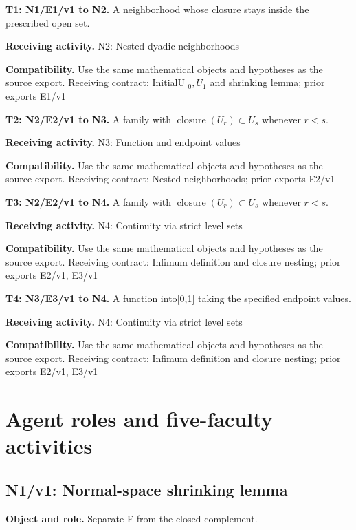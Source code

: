 \documentclass[preprint,12pt,aps,pra,showkeys,amsmath,amssymb,superscriptaddress,floatfix]{revtex4-2}
\theoremstyle{definition}
\theoremstyle{remark}
\newcommand{\field}[2]{\par\smallskip\noindent\textbf{#1.} #2\par}
\begin{document}
\field{T1: N1/E1/v1 to N2}{A neighborhood whose closure stays inside the prescribed open set.}

\field{Receiving activity}{N2: Nested dyadic neighborhoods}

\field{Compatibility}{Use the same mathematical objects and hypotheses as the source export.
Receiving contract: InitialU \(_{0},U_{1}\) and shrinking lemma; prior
exports E1/v1}

\field{T2: N2/E2/v1 to N3}{A family with \(\operatorname{closure} (U_r)\subset U_s\) whenever
\(r<s\).}

\field{Receiving activity}{N3: Function and endpoint values}

\field{Compatibility}{Use the same mathematical objects and hypotheses as the source export.
Receiving contract: Nested neighborhoods; prior exports E2/v1}

\field{T3: N2/E2/v1 to N4}{A family with \(\operatorname{closure} (U_r)\subset U_s\) whenever
\(r<s\).}

\field{Receiving activity}{N4: Continuity via strict level sets}

\field{Compatibility}{Use the same mathematical objects and hypotheses as the source export.
Receiving contract: Infimum definition and closure nesting; prior
exports E2/v1, E3/v1}

\field{T4: N3/E3/v1 to N4}{A function into{[}0,1{]} taking the specified endpoint values.}

\field{Receiving activity}{N4: Continuity via strict level sets}

\field{Compatibility}{Use the same mathematical objects and hypotheses as the source export.
Receiving contract: Infimum definition and closure nesting; prior
exports E2/v1, E3/v1}

\endgroup

\clearpage\section{Agent roles and five-faculty activities}\begingroup\small\linespread{1.05}\selectfont{}

\subsection{N1/v1: Normal-space shrinking lemma}

\field{Object and role}{Separate F from the closed complement.}
\end{document}
